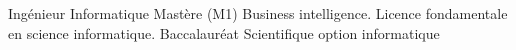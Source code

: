 %
%
%


\begin{scholarship}
					{Ingénieur Informatique }
					{Mastère (M1) Business intelligence.}
					{Licence fondamentale en science informatique.}
					{Baccalauréat Scientifique option informatique}
\end{scholarship}